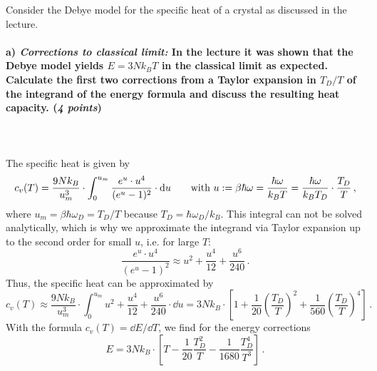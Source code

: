 Consider the Debye model for the specific heat of a crystal as discussed 
in the lecture.

\paragraph{a) \textit{Corrections to classical limit:} In the lecture it was 
    shown that the Debye model yields $E=3Nk_BT$ in the classical limit as 
    expected. Calculate the first two corrections from a Taylor expansion in 
    $T_D/T$ of the integrand of the energy formula and discuss the 
    resulting heat capacity. (\textit{4 points})
} \ \\
    \\
    The specific heat is given by
    \begin{equation}
        c_v(T)
        =\frac{9Nk_B}{u^3_m}\cdot\int_0^{u_m}
        \frac{e^u\cdot u^4}{(e^u-1)^2}\cdot\mathrm{d} u
        \ \ \ \ \ \ \textnormal{with }
        u:=\beta\hbar\omega=\frac{\hbar\omega}{k_BT}
        =\frac{\hbar\omega}{k_BT_D}\cdot\frac{T_D}{T} \,,
    \end{equation}
    where $u_m = \beta\hbar\omega_D = T_D/T$ because $T_D = \hbar\omega_D/k_B$.
    This integral can not be solved analytically, which is why we approximate
    the integrand via Taylor expansion up to the second order for small $u$,
    i.e. for large $T$:
    \begin{equation}
        \frac{e^u\cdot u^4}{(e^u-1)^2}
        \approx u^2+\frac{u^4}{12}+\frac{u^6}{240} \,.
    \end{equation}
    Thus, the specific heat can be approximated by
    \begin{equation}
        c_v(T)
        \approx\frac{9Nk_B}{u^3_m}\cdot\int_0^{u_m}
        u^2+\frac{u^4}{12}+\frac{u^6}{240}\cdot\dd u
        = 3Nk_B\cdot\left[1+\frac{1}{20}\left(\frac{T_D}{T}\right)^2+\frac{1}{560}\left(\frac{T_D}{T}\right)^4\right] \,.
    \end{equation}
    With the formula $c_v(T) = \dd E/\dd T$, we find for the energy corrections
    \begin{equation}
        E
        = 3Nk_B\cdot\left[T-\frac{1}{20}\frac{T_D^2}{T}-\frac{1}{1680}\frac{T_D^4}{T^3}\right] \,.
    \end{equation}

